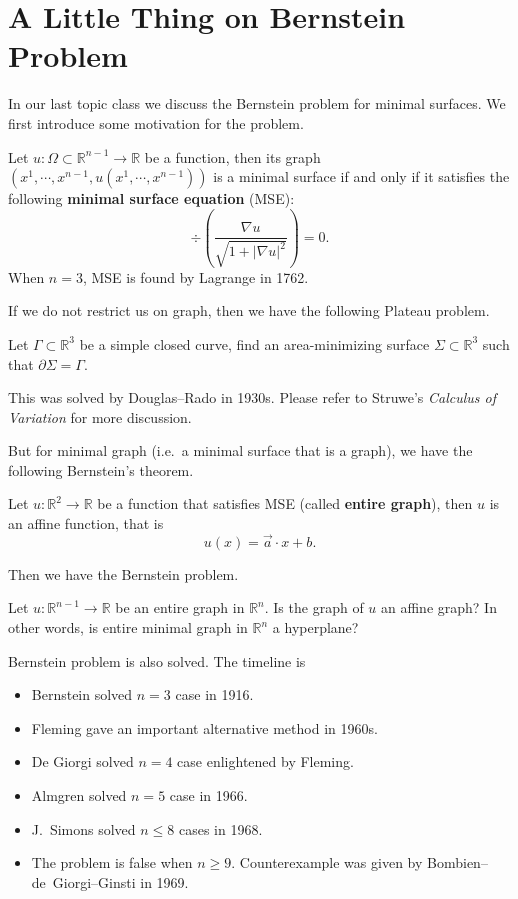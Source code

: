\chapter{A Little Thing on Bernstein Problem}
In our last topic class we discuss the Bernstein problem for minimal surfaces.
We first introduce some motivation for the problem.

Let $u:\Omega\subset\mathbb{R}^{n-1}\to\mathbb{R}$ be a function, then its graph $(x^1,\cdots,x^{n-1},u(x^1,\cdots,x^{n-1}))$ is a minimal surface if and only if it satisfies the following \textbf{minimal surface equation} (MSE):
\[\div\left(\frac{\nabla u}{\sqrt{1+|\nabla u|^2}}\right)=0.\]
When $n=3$, MSE is found by Lagrange in 1762.

If we do not restrict us on graph, then we have the following Plateau problem.
\begin{pro}[Plateau]
    Let $\Gamma\subset\mathbb{R}^3$ be a simple closed curve, find an area-minimizing surface $\Sigma\subset\mathbb{R}^3$ such that $\partial\Sigma=\Gamma$.
\end{pro}

This was solved by Douglas--Rado in 1930s.
Please refer to Struwe's \emph{Calculus of Variation} for more discussion.

But for minimal graph (i.e.\ a minimal surface that is a graph), we have the following Bernstein's theorem.
\begin{thm}[Bernstein, 1916]
    Let $u:\mathbb{R}^2\to\mathbb{R}$ be a function that satisfies MSE (called \textbf{entire graph}), then $u$ is an affine function, that is
    \[u(x)=\vec{a}\cdot x+b.\]
\end{thm}

Then we have the Bernstein problem.
\begin{pro}[Bernstein]
    Let $u:\mathbb{R}^{n-1}\to\mathbb{R}$ be an entire graph in $\mathbb{R}^n$.
    Is the graph of $u$ an affine graph?
    In other words, is entire minimal graph in $\mathbb{R}^n$ a hyperplane?
\end{pro}

Bernstein problem is also solved.
The timeline is
\begin{itemize}
    \item Bernstein solved $n=3$ case in 1916.
    \item Fleming gave an important alternative method in 1960s.
    \item De Giorgi solved $n=4$ case enlightened by Fleming.
    \item Almgren solved $n=5$ case in 1966.
    \item J.\ Simons solved $n\leq 8$ cases in 1968.
    \item The problem is false when $n\geq 9$.
    Counterexample was given by Bombien--de~Giorgi--Ginsti in 1969.
\end{itemize}

